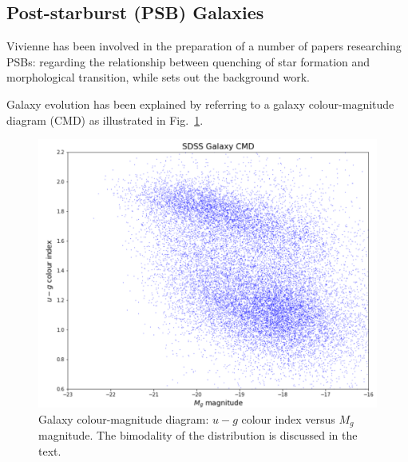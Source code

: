 \subsection{Post-starburst (PSB) Galaxies}
\label{sec:PSBs}
Vivienne has been involved in the preparation of a number of papers researching PSBs: \citet{2017MNRAS.472.1401A} regarding the relationship between quenching of star formation and morphological transition, while \citet{2016MNRAS.463..832W} sets out the background work.
\par Galaxy evolution has been explained by referring to a galaxy colour-magnitude diagram (CMD) as illustrated in Fig.~\ref{fig:CMD1}.

\begin{figure}
	\includegraphics[width=\columnwidth]{images/galaxyCMD.PNG}
    \caption{Galaxy colour-magnitude diagram: $u-g$ colour index versus $M_g$ magnitude. The bimodality of the distribution is discussed in the text.}
    \label{fig:CMD1}
\end{figure}